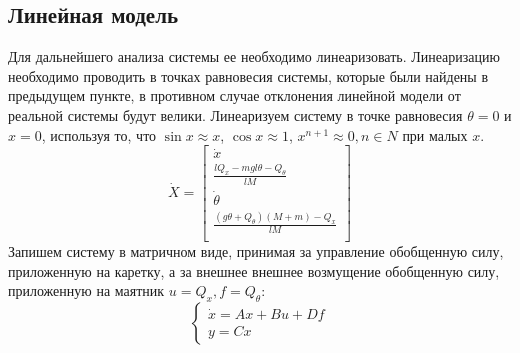 \subsection{Линейная модель}
Для дальнейшего анализа системы ее необходимо линеаризовать. Линеаризацию необходимо проводить в точках равновесия 
системы, которые были найдены в предыдущем пункте, в противном случае отклонения линейной модели от реальной системы будут велики. 
Линеаризуем систему в точке равновесия $\theta = 0$ и $x = 0$, используя то, что $\sin x \approx x$, $\cos x \approx 1$, $x^{n + 1} \approx 0, n \in N$ 
при малых $x$. 
\begin{equation}
    \dot{X} = \begin{bmatrix}
        \dot{x} \\
        \frac{lQ_x - mgl\theta - Q_{\theta}}{lM} \\
        \dot{\theta} \\
        \frac{(g\theta + Q_{\theta})(M + m) -Q_x}{lM} \\ 
    \end{bmatrix}
\end{equation}
Запишем систему в матричном виде, принимая за управление обобщенную силу, приложенную на каретку, а за внешнее 
внешнее возмущение обобщенную силу, приложенную на маятник $u = Q_x, f = Q_{\theta}$:
\begin{equation}
    \begin{cases}
        \dot{x} = Ax + Bu + Df \\ 
        y = Cx
    \end{cases}
    \label{eq:linear_model}
\end{equation}

